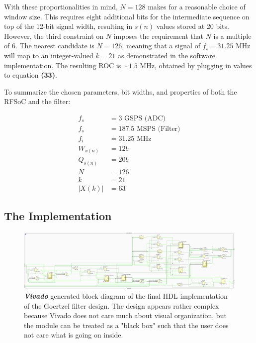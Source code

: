 \documentclass[reprint,amsmath,amssymb]{revtex4-2}
\begin{document}
With these proportionalities in mind, $N = 128$ makes for a reasonable choice of window size. This requires eight additional bits for the intermediate sequence on top of the 12-bit signal width, resulting in $s(n)$ values stored at 20 bits. However, the third constraint on $N$ imposes the requirement that $N$ is a multiple of 6. The nearest candidate is $N = 126$, meaning that a signal of $f_i = 31.25$ MHz will map to an integer-valued $k = 21$ as demonstrated in the software implementation. The resulting ROC is $\sim 1.5$ MHz, obtained by plugging in values to equation \textbf{(33)}.

To summarize the chosen parameters, bit widths, and properties of both the RFSoC and the filter:

\begin{align}
    f_{s} & = 3 \text{ GSPS \ \ \ \ \ \ \ (ADC)} \nonumber \\
    f_{s} & = 187.5 \text{ MSPS \ (Filter)} \nonumber \\
    f_{i} & = 31.25 \text{ MHz} \nonumber \\
    W_{x(n)} & = 12b \nonumber \\
    Q_{s(n)} & = 20b \nonumber \\
    N & = 126 \nonumber \\
    k & = 21 \nonumber \\
    |X(k)| & = 63 \nonumber
\end{align}

\subsection{The Implementation}

\begin{figure}
    \centering
    \includegraphics[width=\linewidth]{figs/bd_goertzel.png}
    \caption{\textit{\textbf{Vivado}} generated block diagram of the final HDL implementation of the Goertzel filter design. The design appears rather complex because Vivado does not care much about visual organization, but the module can be treated as a "black box" such that the user does not care what is going on inside.}
    \label{fig:13}
\end{figure}
\end{document}

